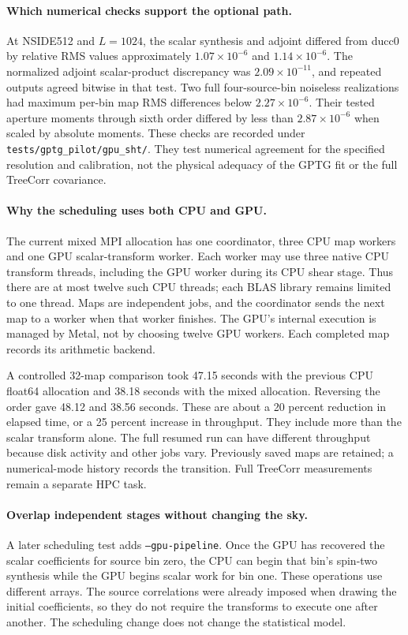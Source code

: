 \paragraph{Which numerical checks support the optional path.}
At NSIDE512 and $L=1024$, the scalar synthesis and adjoint differed from
ducc0 by relative RMS values approximately $1.07\times10^{-6}$ and
$1.14\times10^{-6}$. The normalized adjoint scalar-product discrepancy was
$2.09\times10^{-11}$, and repeated outputs agreed bitwise in that test.
Two full four-source-bin noiseless realizations had maximum per-bin map
RMS differences below $2.27\times10^{-6}$. Their tested aperture moments
through sixth order differed by less than $2.87\times10^{-6}$ when scaled
by absolute moments. These checks are recorded under
\texttt{tests/gptg\_pilot/gpu\_sht/}. They test numerical agreement for the
specified resolution and calibration, not the physical adequacy of the
GPTG fit or the full TreeCorr covariance.

\paragraph{Why the scheduling uses both CPU and GPU.}
The current mixed MPI allocation has one coordinator, three CPU map
workers and one GPU scalar-transform worker. Each worker may use three
native CPU transform threads, including the GPU worker during its CPU
shear stage. Thus there are at most twelve such CPU threads; each BLAS
library remains limited to one thread. Maps are independent jobs, and
the coordinator sends the next map to a worker when that worker finishes.
The GPU's internal execution is managed by Metal, not by choosing twelve
GPU workers. Each completed map records its arithmetic backend.

A controlled 32-map comparison took 47.15 seconds with the previous CPU
float64 allocation and 38.18 seconds with the mixed allocation. Reversing
the order gave 48.12 and 38.56 seconds. These are about a 20 percent
reduction in elapsed time, or a 25 percent increase in throughput. They
include more than the scalar transform alone. The full resumed run can
have different throughput because disk activity and other jobs vary.
Previously saved maps are retained; a numerical-mode history records the
transition. Full TreeCorr measurements remain a separate HPC task.


\paragraph{Overlap independent stages without changing the sky.}
A later scheduling test adds \texttt{--gpu-pipeline}. Once the GPU has
recovered the scalar coefficients for source bin zero, the CPU can begin
that bin's spin-two synthesis while the GPU begins scalar work for bin
one. These operations use different arrays. The source correlations were
already imposed when drawing the initial coefficients, so they do not
require the transforms to execute one after another. The scheduling change
does not change the statistical model.

